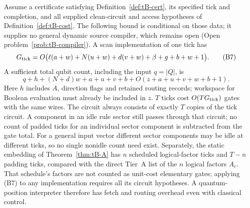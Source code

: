 \begin{theorem}\label{thm:tB-cost}
Assume a certificate satisfying Definition~\ref{def:tB-cert}, its
specified tick and completion, and all supplied clean-circuit and
access hypotheses of Definition~\ref{def:tB-cost}. The following bound
is conditional on those data; it supplies no general dynamic source
compiler, which remains open (Open problem~\ref{prob:tB-compiler}).
A scan implementation of one tick has
\[
 G_{\rm tick}=O\bigl(\ell(a+w)+N(u+w)+d(v+w)
                  +\beta+g+b+w+1\bigr).                    \tag{B7}
\]
A sufficient total qubit count, including the input $q=|Q|$, is
\[
 q+h+(N+d)w+a+u+v+b+
 O(z+a+u+v+w+b+1).                                        \tag{B8}
\]
Here $h$ includes $A$, direction flags and retained routing records;
workspace for Boolean evaluation must already be included in $z$.
$T$ ticks cost $O(TG_{\rm tick})$ gates with the same wires.
The circuit always consists of exactly $T$ copies of the tick circuit.
A component in an idle rule sector still passes through that circuit;
no count of padded ticks for an individual sector component is subtracted
from the gate total. For a general input vector different sector
components may be idle at different ticks, so no single nonidle count
need exist. Separately, the static embedding of Theorem~\ref{thm:tB-A}
has $n$ scheduled logical-factor ticks and $T-n$ padding ticks, compared
with the direct Tier~A list of the $n$ logical factors $A_c$.
That schedule's factors are not counted as unit-cost elementary gates;
applying (B7) to any implementation requires all its circuit hypotheses.
A quantum-position interpreter therefore has
fetch and routing overhead even with classical control.
\end{theorem}
